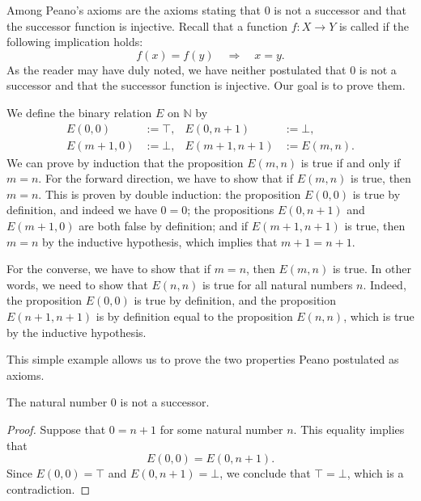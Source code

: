 Among Peano's axioms are the axioms stating that $0$ is not a successor and that the successor function is injective. Recall that a function $f:X\to Y$ is called  if the following implication holds:
\begin{equation*}
  f(x)=f(y)\quad\Rightarrow\quad x=y.
\end{equation*}
As the reader may have duly noted, we have neither postulated that $0$ is not a successor and that the successor function is injective. Our goal is to prove them.

\begin{example}
  We define the binary relation $E$ on $\mathbb{N}$ by
  \begin{align*}
    E(0,0) & := \top, & E(0,n+1) & := \bot, \\
    E(m+1,0) & := \bot, & E(m+1,n+1) & := E(m,n).
  \end{align*}
  We can prove by induction that the proposition $E(m,n)$ is true if and only if $m=n$. For the forward direction, we have to show that if $E(m,n)$ is true, then $m=n$. This is proven by double induction: the proposition $E(0,0)$ is true by definition, and indeed we have $0=0$; the propositions $E(0,n+1)$ and $E(m+1,0)$ are both false by definition; and if $E(m+1,n+1)$ is true, then $m=n$ by the inductive hypothesis, which implies that $m+1=n+1$.

  For the converse, we have to show that if $m=n$, then $E(m,n)$ is true. In other words, we need to show that $E(n,n)$ is true for all natural numbers $n$. Indeed, the proposition $E(0,0)$ is true by definition, and the proposition $E(n+1,n+1)$ is by definition equal to the proposition $E(n,n)$, which is true by the inductive hypothesis.
\end{example}

This simple example allows us to prove the two properties Peano postulated as axioms.

\begin{theorem}\label{theorem:is-not-successor-zero-nat}
  The natural number $0$ is not a successor.
\end{theorem}

\begin{proof}
  Suppose that $0=n+1$ for some natural number $n$. This equality implies that
  \begin{equation*}
    E(0,0)=E(0,n+1).
  \end{equation*}
  Since $E(0,0)=\top$ and $E(0,n+1)=\bot$, we conclude that $\top=\bot$, which is a contradiction.
\end{proof}

